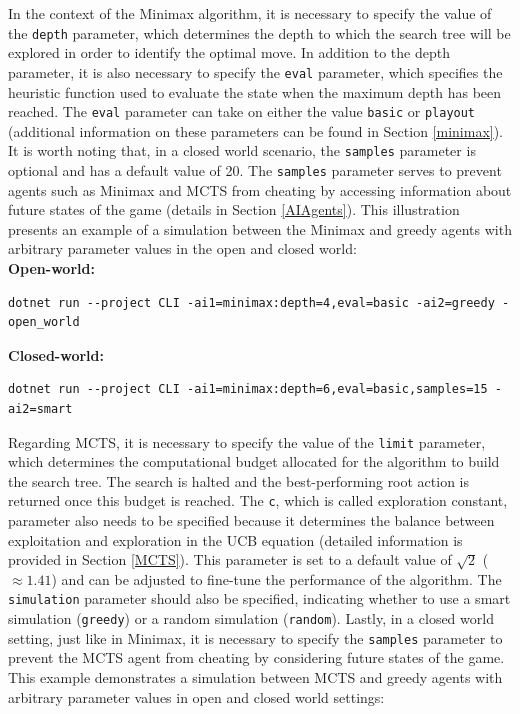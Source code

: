 In the context of the Minimax algorithm, it is necessary to specify the value of the \texttt{depth} parameter, which determines the depth to which the search tree will be explored in order to identify the optimal move. In addition to the depth parameter, it is also necessary to specify the \texttt{eval} parameter, which specifies the heuristic function used to evaluate the state when the maximum depth has been reached. The \texttt{eval} parameter can take on either the value \texttt{basic} or \texttt{playout} (additional information on these parameters can be found in Section \ref{minimax}). It is worth noting that, in a closed world scenario, the \texttt{samples} parameter is optional and has a default value of 20. The \texttt{samples} parameter serves to prevent agents such as Minimax and MCTS from cheating by accessing information about future states of the game (details in Section \ref{AIAgents}). This illustration presents an example of a simulation between the Minimax and greedy agents with arbitrary parameter values in the open and closed world:\\

\textbf{Open-world: }
\begin{lstlisting}
dotnet run --project CLI -ai1=minimax:depth=4,eval=basic -ai2=greedy -open_world
\end{lstlisting}

\textbf{Closed-world: }
\begin{lstlisting}
dotnet run --project CLI -ai1=minimax:depth=6,eval=basic,samples=15 -ai2=smart
\end{lstlisting}

Regarding MCTS, it is necessary to specify the value of the \texttt{limit} parameter, which determines the computational budget allocated for the algorithm to build the search tree. The search is halted and the best-performing root action is returned once this budget is reached. The \texttt{c}, which is called exploration constant, parameter also needs to be specified because it determines the balance between exploitation and exploration in the UCB equation (detailed information is provided in Section \ref{MCTS}). This parameter is set to a default value of  $\sqrt{2}$ ($\approx 1.41$) and can be adjusted to fine-tune the performance of the algorithm. The \texttt{simulation} parameter should also be specified, indicating whether to use a smart simulation (\texttt{greedy}) or a random simulation (\texttt{random}). Lastly, in a closed world setting, just like in Minimax, it is necessary to specify the \texttt{samples} parameter to prevent the MCTS agent from cheating by considering future states of the game. This example demonstrates a simulation between MCTS and greedy agents with arbitrary parameter values in open and closed world settings: \\

